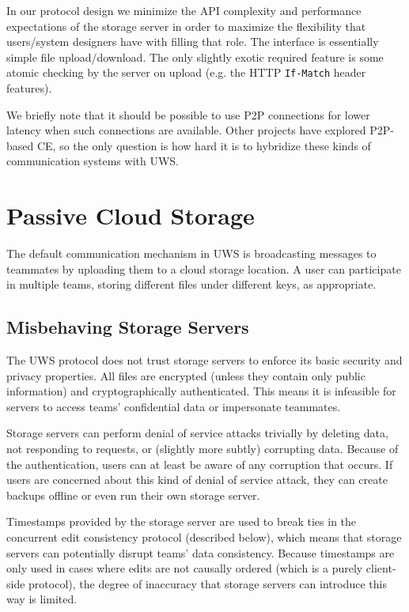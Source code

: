 \documentclass[runningheads]{llncs}
\begin{document}
In our protocol design we minimize the API complexity and performance expectations of the storage server in order to maximize the flexibility that users{\slash}system designers have with filling that role.
The interface is essentially simple file upload{\slash}download.
The only slightly exotic required feature is some atomic checking by the server on upload (e.g. the HTTP \texttt{If-Match} header features).

We briefly note that it should be possible to use P2P connections for lower latency when such connections are available.
Other projects have explored P2P-based CE, so the only question is how hard it is to hybridize these kinds of communication systems with UWS.

\section{Passive Cloud Storage}

The default communication mechanism in UWS is broadcasting messages to teammates by uploading them to a cloud storage location.
A user can participate in multiple teams, storing different files under different keys, as appropriate.

\subsection{Misbehaving Storage Servers}

The UWS protocol does not trust storage servers to enforce its basic security and privacy properties.
All files are encrypted (unless they contain only public information) and cryptographically authenticated.
This means it is infeasible for servers to access teams' confidential data or impersonate teammates.

Storage servers can perform denial of service attacks trivially by deleting data, not responding to requests, or (slightly more subtly) corrupting data.
Because of the authentication, users can at least be aware of any corruption that occurs.
If users are concerned about this kind of denial of service attack, they can create backups offline or even run their own storage server.

Timestamps provided by the storage server are used to break ties in the concurrent edit consistency protocol (described below), which means that storage servers can potentially disrupt teams' data consistency.
Because timestamps are only used in cases where edits are not causally ordered (which is a purely client-side protocol), the degree of inaccuracy that storage servers can introduce this way is limited.
\end{document}
